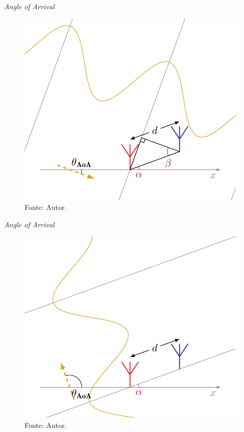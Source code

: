     \begin{frame}{\textit{Angle of Arrival}}
        \begin{figure}
            \centering
            \caption*{$ \theta_\text{AoA} = \SI{-20}{\degree} $, $\textcolor{cmyk_M}{\alpha_{k}}=\SI{20}{\degree}$, $ \textcolor{Purple}{\beta_{\pm k}} = \SI{40}{\degree} $}
            \includegraphics{../pictures/AoA_2}
            \caption*{ \tiny Fonte: Autor.}
        \end{figure}
    \end{frame}

    \begin{frame}{\textit{Angle of Arrival}}
        \begin{figure}
            \centering
            \caption*{$ \theta_\text{AoA}=\SI{110}{\degree} $, $\textcolor{cmyk_M}{\alpha_{k}}=\SI{20}{\degree}$, $ \textcolor{Purple}{\beta_{\pm k}} = \SI{90}{\degree} $}
            \includegraphics{../pictures/AoA_3}
            \caption*{ \tiny Fonte: Autor.}
        \end{figure}
    \end{frame}

